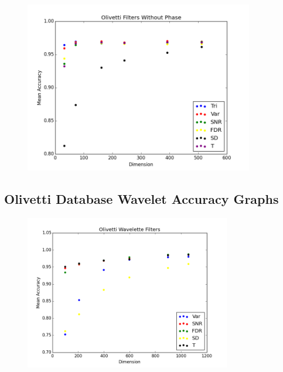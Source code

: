 \documentclass[12pt, letterpaper]{article}
\begin{document}
\begin{center}
	\begin{figure}[H]
		\centering
		\includegraphics[width=10cm, keepaspectratio]{fftAcc/o_filters_nophase_1}
		\label{fig:gfoopt}
	\end{figure}
\end{center}

\subsection{Olivetti Database Wavelet Accuracy Graphs}

\begin{center}
	\begin{figure}[H]
		\centering
		\includegraphics[width=9cm, keepaspectratio]{fftAcc/o_filters_wl}
		\label{fig:gfow}
	\end{figure}
\end{center}
\end{document}
